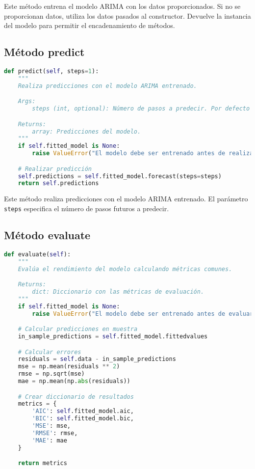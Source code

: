 \documentclass[12pt,letterpaper]{report}
\begin{document}
Este método entrena el modelo ARIMA con los datos proporcionados. Si no se proporcionan datos, utiliza los datos pasados al constructor. Devuelve la instancia del modelo para permitir el encadenamiento de métodos.

\subsection{Método predict}
\begin{lstlisting}[language=python]
def predict(self, steps=1):
    """
    Realiza predicciones con el modelo ARIMA entrenado.

    Args:
        steps (int, optional): Número de pasos a predecir. Por defecto es 1.

    Returns:
        array: Predicciones del modelo.
    """
    if self.fitted_model is None:
        raise ValueError("El modelo debe ser entrenado antes de realizar predicciones")

    # Realizar predicción
    self.predictions = self.fitted_model.forecast(steps=steps)
    return self.predictions
\end{lstlisting}

Este método realiza predicciones con el modelo ARIMA entrenado. El parámetro \texttt{steps} especifica el número de pasos futuros a predecir.

\subsection{Método evaluate}
\begin{lstlisting}[language=python]
def evaluate(self):
    """
    Evalúa el rendimiento del modelo calculando métricas comunes.

    Returns:
        dict: Diccionario con las métricas de evaluación.
    """
    if self.fitted_model is None:
        raise ValueError("El modelo debe ser entrenado antes de evaluarlo")

    # Calcular predicciones en muestra
    in_sample_predictions = self.fitted_model.fittedvalues

    # Calcular errores
    residuals = self.data - in_sample_predictions
    mse = np.mean(residuals ** 2)
    rmse = np.sqrt(mse)
    mae = np.mean(np.abs(residuals))

    # Crear diccionario de resultados
    metrics = {
        'AIC': self.fitted_model.aic,
        'BIC': self.fitted_model.bic,
        'MSE': mse,
        'RMSE': rmse,
        'MAE': mae
    }

    return metrics
\end{lstlisting}
\end{document}
